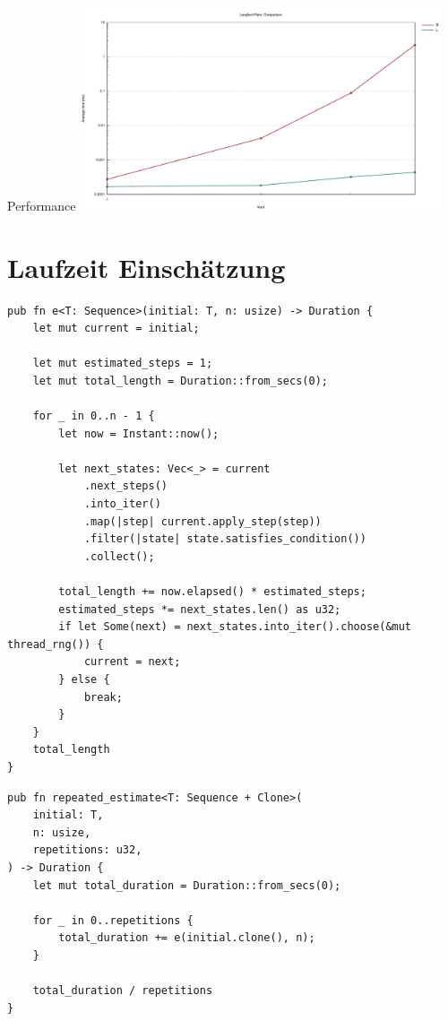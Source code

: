 \documentclass[aspectratio=43,t]{beamer}
\begin{document}

\begin{frame}[fragile]{Performance}
  \includegraphics[width=0.8\textwidth, clip]{../img/langford_lines.pdf}
\end{frame}
\section{Laufzeit Einschätzung}
\begin{frame}[fragile]
  \begin{verbatim}
pub fn e<T: Sequence>(initial: T, n: usize) -> Duration {
    let mut current = initial;

    let mut estimated_steps = 1;
    let mut total_length = Duration::from_secs(0);

    for _ in 0..n - 1 {
        let now = Instant::now();

        let next_states: Vec<_> = current
            .next_steps()
            .into_iter()
            .map(|step| current.apply_step(step))
            .filter(|state| state.satisfies_condition())
            .collect();

        total_length += now.elapsed() * estimated_steps;
        estimated_steps *= next_states.len() as u32;
        if let Some(next) = next_states.into_iter().choose(&mut thread_rng()) {
            current = next;
        } else {
            break;
        }
    }
    total_length
}
  \end{verbatim}
\end{frame}
\begin{frame}[fragile]
  \begin{verbatim}
pub fn repeated_estimate<T: Sequence + Clone>(
    initial: T,
    n: usize,
    repetitions: u32,
) -> Duration {
    let mut total_duration = Duration::from_secs(0);

    for _ in 0..repetitions {
        total_duration += e(initial.clone(), n);
    }

    total_duration / repetitions
}
  \end{verbatim}
\end{frame}
\end{document}
